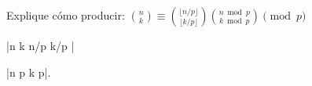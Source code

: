 

\bigskip

\enunciadoS Explique c\'omo producir: $\displaystyle{{n \choose k} \equiv 
{\lfloor n/p \rfloor \choose \lfloor k/p \rfloor}
{n \bmod p \choose k \bmod p}\pmod{p}}$

\bigskip

\respuestaS |{n \choose k} \equiv 
{\lfloor n/p \rfloor \choose \lfloor k/p \rfloor}|

\noindent|{n \bmod p \choose k \bmod p}|.

\bye

